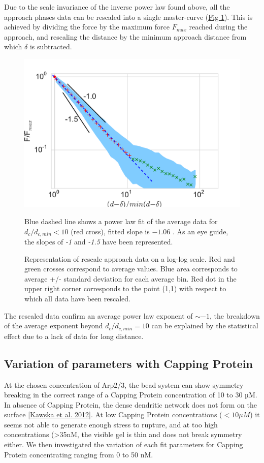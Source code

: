 \documentclass[A4paperpaper,11pt,english]{sphinxmanual}
\begin{document}
Due to the scale invariance of the inverse power law found above,  all the
approach phases data can be rescaled into a single master-curve (\hyperref[index-latex:fig-rescale-powerlaw]{Fig  \ref*{index-latex:fig-rescale-powerlaw}}). This is achieved
by dividing the force by the maximum force \(F_{max}\) reached during the
approach, and rescaling the distance by the minimum approach distance from which
\(\delta\) is subtracted.
\begin{figure}[htbp]
\centering
\capstart

\includegraphics[width=0.700\linewidth]{rescaled_powerlaw.pdf}
\caption{Representation of rescale approach data on a log-log scale.  Red and green
crosses correspond to average values. Blue area corresponds to average +/-
standard deviation for each average bin. Red dot in the upper right corner
corresponds to the point (1,1) with respect to which all data have been
rescaled.}{\small 
Blue dashed line shows a power law fit of the average data for
\(d_c/d_{c,min} < 10\) (red cross), fitted slope is \(-1.06\) .
As an eye guide, the slopes of \emph{-1} and \emph{-1.5} have been represented.
}\label{index-latex:fig-rescale-powerlaw}\end{figure}

The rescaled data confirm an average power law exponent of \(\sim -1\), the
breakdown of the average exponent beyond \(d_c/d_{c,min}=10\) can be
explained by the statistical effect due to a lack of data for long distance.


\subsection{Variation of parameters with Capping Protein}
\label{index-latex:variation-of-parameters-with-capping-protein}
At the chosen concentration of Arp2/3, the bead system can show symmetry
breaking in the correct range of a Capping Protein concentration of 10 to 30
µM. In absence of Capping Protein, the dense dendritic network does not form on
the surface {\hyperref[index-latex:kawska2012]{{[}Kawska et al. 2012{]}}}. At low Capping Protein concentrations (\(<10 \mu{}M\)) it seems not able to generate enough stress to
rupture, and at too high concentrations (\textgreater{}35nM, the visible gel is thin and does
not break symmetry either. We then investigated the variation of each fit parameters for Capping Protein concentrating ranging from 0 to 50 nM.
\end{document}

